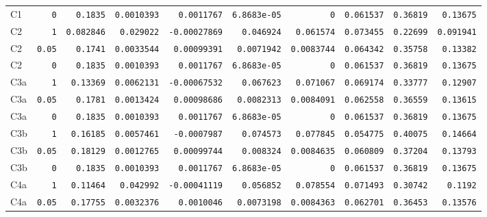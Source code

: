 \begin{longtable}{lrrrrrrrrr}
C1 & \texttt{0} & \texttt{0.1835} & \texttt{0.0010393} & \texttt{0.0011767} & \texttt{6.8683e-05} & \texttt{0} & \texttt{0.061537} & \texttt{0.36819} & \texttt{0.13675} \\
C2 & \texttt{1} & \texttt{0.082846} & \texttt{0.029022} & \texttt{-0.00027869} & \texttt{0.046924} & \texttt{0.061574} & \texttt{0.073455} & \texttt{0.22699} & \texttt{0.091941} \\
C2 & \texttt{0.05} & \texttt{0.1741} & \texttt{0.0033544} & \texttt{0.00099391} & \texttt{0.0071942} & \texttt{0.0083744} & \texttt{0.064342} & \texttt{0.35758} & \texttt{0.13382} \\
C2 & \texttt{0} & \texttt{0.1835} & \texttt{0.0010393} & \texttt{0.0011767} & \texttt{6.8683e-05} & \texttt{0} & \texttt{0.061537} & \texttt{0.36819} & \texttt{0.13675} \\
C3a & \texttt{1} & \texttt{0.13369} & \texttt{0.0062131} & \texttt{-0.00067532} & \texttt{0.067623} & \texttt{0.071067} & \texttt{0.069174} & \texttt{0.33777} & \texttt{0.12907} \\
C3a & \texttt{0.05} & \texttt{0.1781} & \texttt{0.0013424} & \texttt{0.00098686} & \texttt{0.0082313} & \texttt{0.0084091} & \texttt{0.062558} & \texttt{0.36559} & \texttt{0.13615} \\
C3a & \texttt{0} & \texttt{0.1835} & \texttt{0.0010393} & \texttt{0.0011767} & \texttt{6.8683e-05} & \texttt{0} & \texttt{0.061537} & \texttt{0.36819} & \texttt{0.13675} \\
C3b & \texttt{1} & \texttt{0.16185} & \texttt{0.0057461} & \texttt{-0.0007987} & \texttt{0.074573} & \texttt{0.077845} & \texttt{0.054775} & \texttt{0.40075} & \texttt{0.14664} \\
C3b & \texttt{0.05} & \texttt{0.18129} & \texttt{0.0012765} & \texttt{0.00099744} & \texttt{0.008324} & \texttt{0.0084635} & \texttt{0.060809} & \texttt{0.37204} & \texttt{0.13793} \\
C3b & \texttt{0} & \texttt{0.1835} & \texttt{0.0010393} & \texttt{0.0011767} & \texttt{6.8683e-05} & \texttt{0} & \texttt{0.061537} & \texttt{0.36819} & \texttt{0.13675} \\
C4a & \texttt{1} & \texttt{0.11464} & \texttt{0.042992} & \texttt{-0.00041119} & \texttt{0.056852} & \texttt{0.078554} & \texttt{0.071493} & \texttt{0.30742} & \texttt{0.1192} \\
C4a & \texttt{0.05} & \texttt{0.17755} & \texttt{0.0032376} & \texttt{0.0010046} & \texttt{0.0073198} & \texttt{0.0084363} & \texttt{0.062701} & \texttt{0.36453} & \texttt{0.13576} \\

\end{longtable}
